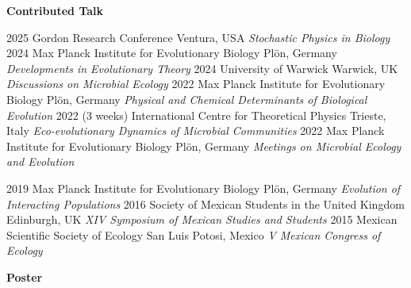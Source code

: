 \documentclass[]{friggeri-cv} %
\begin{document}
\textbf{Contributed Talk}

\begin{entrylist}
\entry
{2025}
{}
{Gordon Research Conference}
{Ventura, USA}
{\emph{Stochastic Physics in Biology}}
{\vspace{-3mm}}
\entry
{2024}
{}%
{Max Planck Institute for Evolutionary Biology}
{Plön, Germany}
{\emph{Developments in Evolutionary Theory}}
{\vspace{-3mm}}
\entry
{2024}
{}%
{University of Warwick}
{Warwick, UK}
{\emph{Discussions on Microbial Ecology}}
{\vspace{-3mm}}
\entry
{2022}
{}%
{Max Planck Institute for Evolutionary Biology}
{Plön, Germany}
{\emph{Physical and Chemical Determinants of Biological Evolution}}
{\vspace{-3mm}}
\entry
{2022}
{(3 weeks)}
{International Centre for Theoretical Physics}
{Trieste, Italy}
{\emph{Eco-evolutionary Dynamics of Microbial Communities}}
{\vspace{-3mm}}
\entry
{2022}
{}%
{Max Planck Institute for Evolutionary Biology}
{Plön, Germany}
{\emph{Meetings on Microbial Ecology and Evolution}}
{\vspace{-3mm}}
\end{entrylist}
\begin{entrylist}
\entry
{2019}
{}%
{Max Planck Institute for Evolutionary Biology}
{Plön, Germany}
{\emph{Evolution of Interacting Populations}}
{\vspace{-3mm}}
\entry
{2016}
{}%
{Society of Mexican Students in the United Kingdom}
{Edinburgh, UK}
{\emph{XIV Symposium of Mexican Studies and Students}}
{\vspace{-3mm}}
\entry
{2015}
{}%
{Mexican Scientific Society of Ecology}
{San Luis Potosi, Mexico}
{\emph{V Mexican Congress of Ecology}}
{\vspace{-3mm}}
\end{entrylist}

\textbf{Poster}
\end{document}
